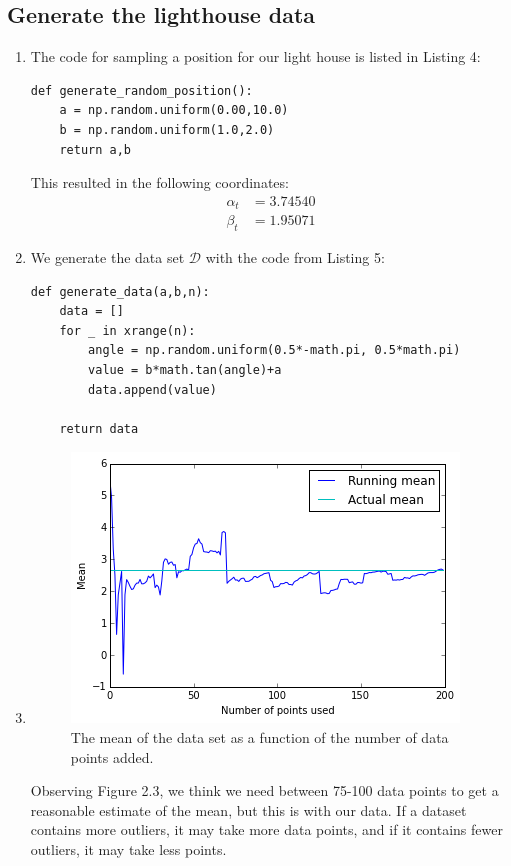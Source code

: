 \documentclass[a4paper,10pt]{article}
\numberwithin{equation}{section} %
\numberwithin{figure}{section} %
\numberwithin{table}{section} %
\theoremstyle{mytheor}
\begin{document}
\subsection{Generate the lighthouse data}
\begin{enumerate}
	\item The code for sampling a position for our light house is listed in Listing 4: \vspace{-0.4cm}
	\begin{lstlisting}[label={list:first},caption=Python code for function \textit{generate\_random\_position()}.]
def generate_random_position():
    a = np.random.uniform(0.00,10.0)
    b = np.random.uniform(1.0,2.0)
    return a,b
    \end{lstlisting}
    		This resulted in the following coordinates:
    		\begin{align}
    		\alpha_t &= 3.74540\\
    		\beta_t &= 1.95071
    		\end{align}
	\item We generate the data set $\mathcal{D}$ with the code from Listing 5: \vspace{-0.4cm} \begin{lstlisting}[label={list:first},caption=Python code for function \textit{generate\_data(a,b,n)}.]
def generate_data(a,b,n):
    data = []
    for _ in xrange(n):
        angle = np.random.uniform(0.5*-math.pi, 0.5*math.pi)
        value = b*math.tan(angle)+a
        data.append(value)
    
    return data
    \end{lstlisting}
	\item \begin{figure}[h!]
   			\centering
   			\includegraphics{meany.png}\vspace{-0.2cm}
   			\caption{\vspace{-0.2cm} The mean of the data set as a function of the number of data points added. }
  		\end{figure}
  		Observing Figure 2.3, we think we need between 75-100 data points to get a reasonable estimate of the mean, but this is with our data. If a dataset contains more outliers, it may take more data points, and if it contains fewer outliers, it may take less points.
\end{enumerate}
\end{document}
